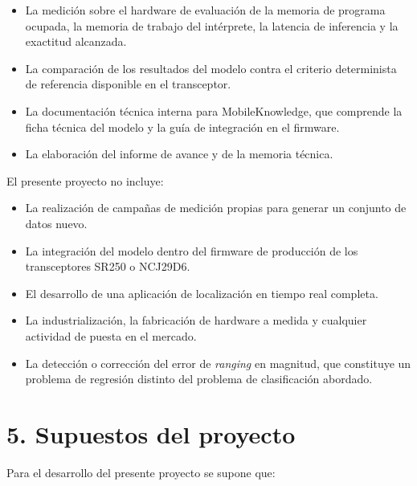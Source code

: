 \documentclass[
11pt, %
]{charter}
\begin{document}
\begin{itemize}
    \item La medición sobre el hardware de evaluación de la memoria de programa ocupada, la memoria de trabajo del intérprete, la latencia de inferencia y la exactitud alcanzada.
    \item La comparación de los resultados del modelo contra el criterio determinista de referencia disponible en el transceptor.
    \item La documentación técnica interna para MobileKnowledge, que comprende la ficha técnica del modelo y la guía de integración en el firmware.
    \item La elaboración del informe de avance y de la memoria técnica.
\end{itemize}

El presente proyecto no incluye:

\begin{itemize}
    \item La realización de campañas de medición propias para generar un conjunto de datos nuevo.
    \item La integración del modelo dentro del firmware de producción de los transceptores SR250 o NCJ29D6.
    \item El desarrollo de una aplicación de localización en tiempo real completa.
    \item La industrialización, la fabricación de hardware a medida y cualquier actividad de puesta en el mercado.
    \item La detección o corrección del error de \textit{ranging} en magnitud, que constituye un problema de regresión distinto del problema de clasificación abordado.
\end{itemize}

\section{5. Supuestos del proyecto}
\label{sec:supuestos}

Para el desarrollo del presente proyecto se supone que:
\end{document}
